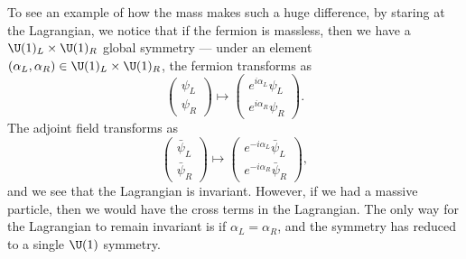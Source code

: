 \documentclass[a4paper]{article}
\begin{document}
To see an example of how the mass makes such a huge difference, by staring at the Lagrangian, we notice that if the fermion is massless, then we have a $\U(1)_L \times \U(1)_R$ global symmetry --- under an element $(\alpha_L, \alpha_R) \in \U(1)_L \times \U(1)_R$, the fermion transforms as
\[
  \begin{pmatrix}
    \psi_L\\
    \psi_R
  \end{pmatrix} \mapsto
  \begin{pmatrix}
    e^{i\alpha_L} \psi_L\\
    e^{i\alpha_R} \psi_R
  \end{pmatrix}.
\]
The adjoint field transforms as
\[
  \begin{pmatrix}
    \bar{\psi}_L\\
    \bar{\psi}_R
  \end{pmatrix} \mapsto
  \begin{pmatrix}
    e^{-i\alpha_L} \bar{\psi}_L\\
    e^{-i\alpha_R} \bar{\psi}_R
  \end{pmatrix},
\]
and we see that the Lagrangian is invariant. However, if we had a massive particle, then we would have the cross terms in the Lagrangian. The only way for the Lagrangian to remain invariant is if $\alpha_L = \alpha_R$, and the symmetry has reduced to a single $\U(1)$ symmetry.
\end{document}
